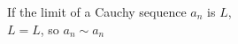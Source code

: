 \documentclass[preview]{standalone}
\begin{document}
\begin{center}
If the limit of a Cauchy sequence $a_n$ is $L$, \\$L = L$, so $a_n \sim a_n$
\end{center}
\end{document}
